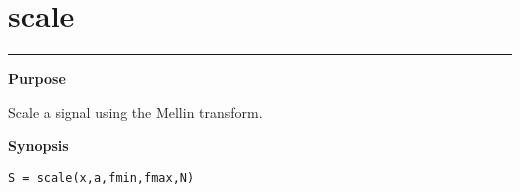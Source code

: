 

\renewcommand{\footnoterule}{}
\section*{\hspace*{-1.6cm} scale}

\vspace*{-.4cm}
\hspace*{-1.6cm}\rule[0in]{16.5cm}{.02cm}
\vspace*{.2cm}



{\bf \large \sf Purpose}\\
\hspace*{1.5cm}
\begin{minipage}[t]{13.5cm}
Scale a signal using the Mellin transform.
\end{minipage}
\vspace*{.2cm}


{\bf \large \sf Synopsis}\\
\hspace*{1.5cm}
\begin{minipage}[t]{13.5cm}
\begin{verbatim}
S = scale(x,a,fmin,fmax,N)
\end{verbatim}
\end{minipage}
\vspace*{.3cm}


